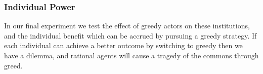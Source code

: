 






\subsubsection*{Individual Power}

In our final experiment we test the effect of greedy actors on these
institutions, and the individual benefit which can be accrued by pursuing a
greedy strategy. If each individual can achieve a better outcome by
switching to greedy then we have a dilemma, and rational
agents will cause a tragedy of the commons through greed. 

